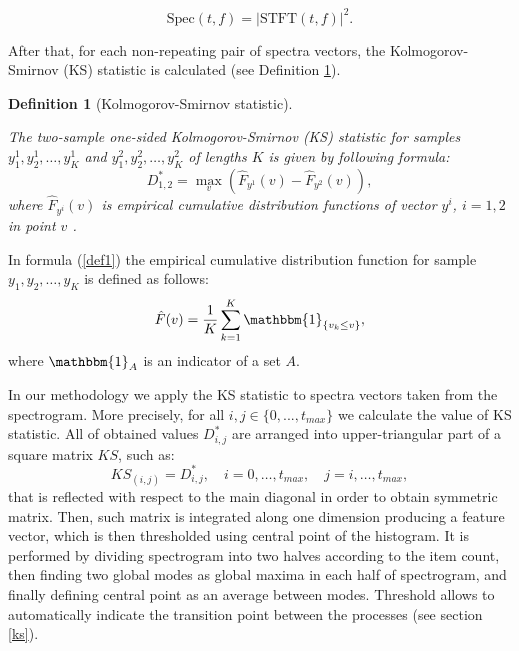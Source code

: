 \documentclass[smallextended]{svjour3}       %
\newtheorem{df}{Definition}
\begin{document}
\begin{equation}
\label{eq:spec}
\textrm{Spec}(t,f)=|\textrm{STFT}(t,f)|^2.
\end{equation}


After that, for each non-repeating pair of spectra vectors, the Kolmogorov-Smirnov (KS) statistic is calculated (see Definition \ref{def}).

\begin{df}[Kolmogorov-Smirnov statistic]\label{def}

The two-sample one-sided Kolmogorov-Smirnov (KS) statistic for samples $y^1_1,y^1_2,\dots,y^1_K$ and $y^2_1,y_2^2,\dots,y^2_K$ of lengths $K$ is given by following formula:
\begin{equation}\label{def1}
    D^*_{1,2}=\max_{v}\left( \hat{F}_{y^1}(v)-\hat{F}_{y^2}(v) \right),
\end{equation}
where $\hat{F}_{y^i}(v)$ is empirical cumulative distribution functions of vector $y^{i}$, $i=1,2$ in point $v$ \cite{wang2003evaluating,massey1951kolmogorov}. 
\end{df}
In formula (\ref{def1}) the empirical cumulative distribution function for sample  $y_1, y_2, \dots, y_K$ is defined as follows:
\begin{equation}
    \hat{F}(v)= \frac{1}{K}\sum^K_{k=1}\mathbbm{1}_{\{ v_k\leq v\}},
\end{equation}
where $\mathbbm{1}_A$ is an indicator of a set $A$.

In our methodology we apply the KS statistic to spectra vectors taken  from the spectrogram. More precisely,  for all $i,j\in \{0,...,t_{max}\}$ we calculate  the value of KS statistic. All of obtained values $D^*_{i,j}$ are arranged into upper-triangular part of a square matrix $KS$, such as:
\begin{equation}
    KS_{(i,j)}=D^*_{i,j},\quad i=0,\dots,t_{max}, \quad j=i,\dots,t_{max},
\end{equation}
that is reflected with respect to the main diagonal in order to obtain symmetric matrix. Then, such matrix is integrated along one dimension producing a feature vector, which is then thresholded using central point of the histogram. It is performed by dividing spectrogram into two halves according to the item count, then finding two global modes as global maxima in each half of spectrogram, and finally defining central point as an average between modes. Threshold allows to automatically indicate the transition point between the processes (see section \ref{ks}).
\end{document}
